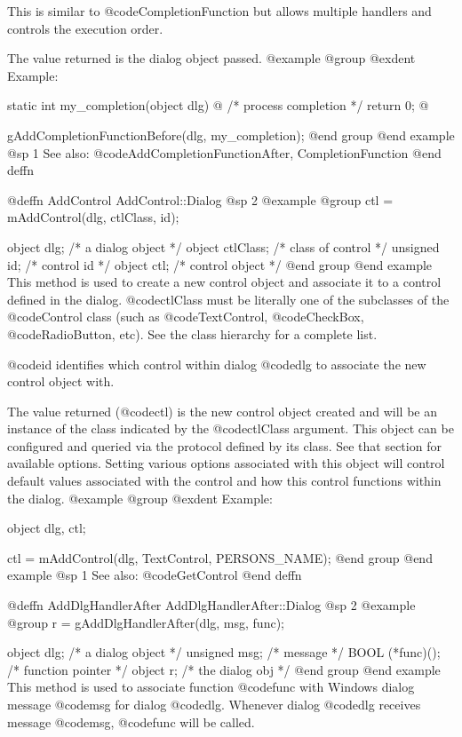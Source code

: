 This is similar to @code{CompletionFunction} but allows multiple handlers
and controls the execution order.

The value returned is the dialog object passed.
@example
@group
@exdent Example:

static int  my_completion(object dlg)
@{
        /*  process completion  */
        return 0;
@}

gAddCompletionFunctionBefore(dlg, my_completion);
@end group
@end example
@sp 1
See also:  @code{AddCompletionFunctionAfter, CompletionFunction}
@end deffn




@deffn {AddControl} AddControl::Dialog
@sp 2
@example
@group
ctl = mAddControl(dlg, ctlClass, id);

object  dlg;       /*  a dialog object   */
object  ctlClass;  /*  class of control  */
unsigned  id;      /*  control id        */
object  ctl;       /*  control object    */
@end group
@end example
This method is used to create a new control object and associate it to
a control defined in the dialog.  @code{ctlClass} must be literally
one of the subclasses of the @code{Control} class (such as
@code{TextControl}, @code{CheckBox}, @code{RadioButton}, etc).
See the class hierarchy for a complete list.

@code{id} identifies which control within dialog @code{dlg} to associate
the new control object with.

The value returned (@code{ctl}) is the new control object created and
will be an instance of the class indicated by the @code{ctlClass}
argument.  This object can be configured and queried via the protocol
defined by its class.  See that section for available options.  Setting
various options associated with this object will control default values
associated with the control and how this control functions within the
dialog.
@example
@group
@exdent Example:

object  dlg, ctl;

ctl = mAddControl(dlg, TextControl, PERSONS_NAME);
@end group
@end example
@sp 1
See also:  @code{GetControl}
@end deffn






@deffn {AddDlgHandlerAfter} AddDlgHandlerAfter::Dialog
@sp 2
@example
@group
r = gAddDlgHandlerAfter(dlg, msg, func);

object   dlg;      /*  a dialog object  */
unsigned msg;      /*  message          */
BOOL    (*func)(); /*  function pointer */
object  r;         /*  the dialog obj   */
@end group
@end example
This method is used to associate function @code{func} with Windows dialog
message @code{msg} for dialog @code{dlg}.  Whenever dialog @code{dlg}
receives message @code{msg}, @code{func} will be called.

